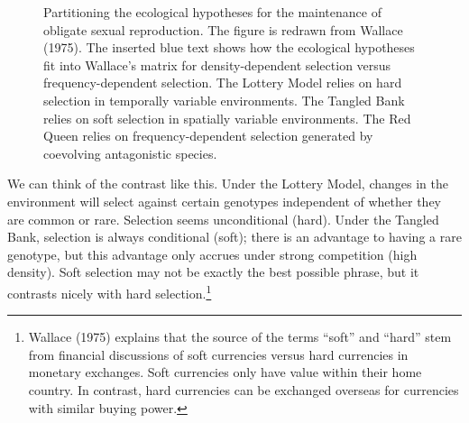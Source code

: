 \documentclass[
  letterpaper,
]{book}
\begin{document}
\begin{figure}


\caption[Partitioning the ecological hypotheses for the maintenance of
obligate sexual reproduction]{\label{fig-2-2}Partitioning the ecological
hypotheses for the maintenance of obligate sexual reproduction. The
figure is redrawn from Wallace (1975). The inserted blue text shows how
the ecological hypotheses fit into Wallace's matrix for
density-dependent selection versus frequency-dependent selection. The
Lottery Model relies on hard selection in temporally variable
environments. The Tangled Bank relies on soft selection in spatially
variable environments. The Red Queen relies on frequency-dependent
selection generated by coevolving antagonistic species.}

\end{figure}%

We can think of the contrast like this. Under the Lottery Model, changes
in the environment will select against certain genotypes independent of
whether they are common or rare. Selection seems unconditional (hard).
Under the Tangled Bank, selection is always conditional (soft); there is
an advantage to having a rare genotype, but this advantage only accrues
under strong competition (high density). Soft selection may not be
exactly the best possible phrase, but it contrasts nicely with hard
selection.\footnote{Wallace (1975) explains that the source of the terms
  ``soft'' and ``hard'' stem from financial discussions of soft
  currencies versus hard currencies in monetary exchanges. Soft
  currencies only have value within their home country. In contrast,
  hard currencies can be exchanged overseas for currencies with similar
  buying power.}
\end{document}
